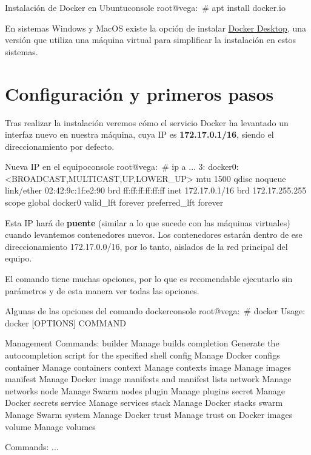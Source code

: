 \begin{mycode}{Instalación de Docker en Ubuntu}{console}{}
root@vega:~# apt install docker.io
\end{mycode}


En sistemas Windows y MacOS existe la opción de instalar \href{https://docs.docker.com/get-docker/}{Docker Desktop}, una versión que utiliza una máquina virtual para simplificar la instalación en estos sistemas.

\section{Configuración y primeros pasos}

Tras realizar la instalación veremos cómo el servicio Docker ha levantado un interfaz nuevo en nuestra máquina, cuya IP es \textbf{172.17.0.1/16}, siendo el direccionamiento por defecto.

\begin{mycode}{Nueva IP en el equipo}{console}{}
root@vega:~# ip a
...
3: docker0: <BROADCAST,MULTICAST,UP,LOWER_UP> mtu 1500 qdisc noqueue
    link/ether 02:42:9c:1f:e2:90 brd ff:ff:ff:ff:ff:ff
    inet 172.17.0.1/16 brd 172.17.255.255 scope global docker0
      valid_lft forever preferred_lft forever
\end{mycode}

Esta IP hará de \textbf{puente} (similar a lo que sucede con las máquinas virtuales) cuando levantemos contenedores nuevos. Los contenedores estarán dentro de ese direccionamiento 172.17.0.0/16, por lo tanto, aislados de la red principal del equipo.


El comando  tiene muchas opciones, por lo que es recomendable ejecutarlo sin parámetros y de esta manera ver todas las opciones.

\begin{mycode}{Algunas de las opciones del comando docker}{console}{}
root@vega:~# docker
Usage:  docker [OPTIONS] COMMAND

Management Commands:
builder     Manage builds
completion  Generate the autocompletion script for the specified shell
config      Manage Docker configs
container   Manage containers
context     Manage contexts
image       Manage images
manifest    Manage Docker image manifests and manifest lists
network     Manage networks
node        Manage Swarm nodes
plugin      Manage plugins
secret      Manage Docker secrets
service     Manage services
stack       Manage Docker stacks
swarm       Manage Swarm
system      Manage Docker
trust       Manage trust on Docker images
volume      Manage volumes

Commands:
...
\end{mycode}

